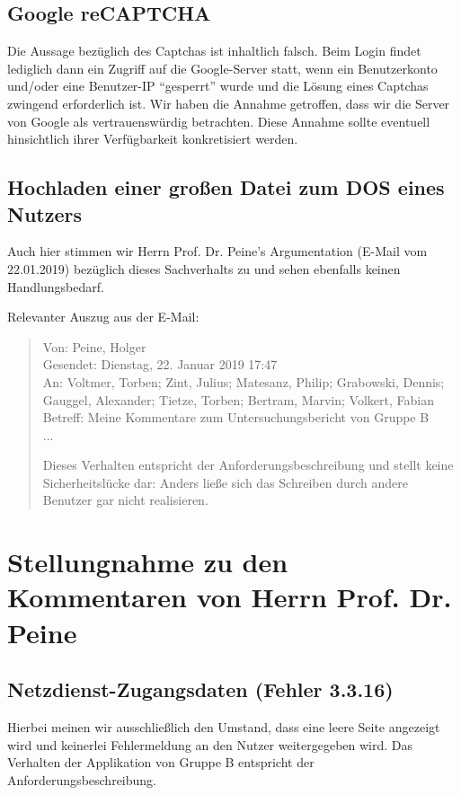 \documentclass[12pt,DIV14,BCOR10mm,a4paper,parskip=half-,headsepline,headinclude,english,ngerman,bibliography=totocnumbered]{scrreprt}
\begin{document}
\section{Google reCAPTCHA}

Die Aussage bezüglich des Captchas ist inhaltlich falsch. Beim Login findet lediglich dann ein Zugriff auf die Google-Server statt, wenn ein Benutzerkonto und/oder eine Benutzer-IP \enquote{gesperrt} wurde und die Lösung eines Captchas zwingend erforderlich ist.
Wir haben die Annahme getroffen, dass wir die Server von Google als vertrauenswürdig betrachten.
Diese Annahme sollte eventuell hinsichtlich ihrer Verfügbarkeit konkretisiert werden.

\section{Hochladen einer großen Datei zum DOS eines Nutzers}

Auch hier stimmen wir Herrn Prof. Dr. Peine's Argumentation (E-Mail vom 22.01.2019) bezüglich dieses Sachverhalts zu und sehen ebenfalls keinen Handlungsbedarf.

Relevanter Auszug aus der E-Mail:

\blockquote{
Von: Peine, Holger \\
Gesendet: Dienstag, 22. Januar 2019 17:47 \\
An: Voltmer, Torben; Zint, Julius; Matesanz, Philip; Grabowski, Dennis; Gauggel, Alexander; Tietze, Torben; Bertram, Marvin; Volkert, Fabian  \\
Betreff: Meine Kommentare zum Untersuchungsbericht von Gruppe B \\

...

Dieses Verhalten entspricht der Anforderungsbeschreibung und stellt
keine Sicherheitslücke dar: Anders ließe sich das Schreiben durch andere
Benutzer gar nicht realisieren.
}

\chapter{Stellungnahme zu den Kommentaren von Herrn Prof. Dr. Peine}

\section{Netzdienst-Zugangsdaten (Fehler 3.3.16)}

Hierbei meinen wir ausschließlich den Umstand, dass eine leere Seite angezeigt wird und keinerlei Fehlermeldung an den Nutzer weitergegeben wird.
Das Verhalten der Applikation von Gruppe B entspricht der Anforderungsbeschreibung.
\end{document}
